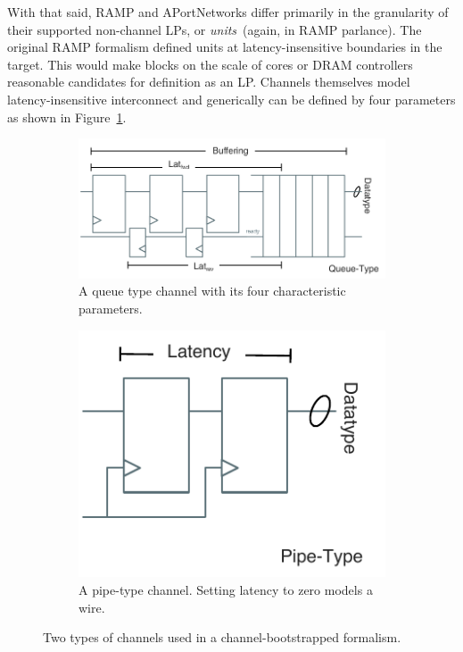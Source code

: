 With that said, RAMP and APortNetworks differ primarily in the granularity of
their supported non-channel LPs, or \emph{units}~(again, in RAMP parlance). The
original RAMP formalism defined units at latency-insensitive boundaries in the
target. This would make blocks on the scale of cores or DRAM controllers
reasonable candidates for definition as an LP. Channels themselves model
latency-insensitive interconnect and generically can be defined by four
parameters as shown in Figure~\ref{fig:queue-channel}.

\begin{figure}[htb]
    \centering
    \begin{subfigure}[t]{0.65\textwidth}
        \captionsetup{margin=0.25cm}
        \includegraphics[width=\columnwidth]{figures/queue-channel.pdf}
        \caption{A queue type channel with its four characteristic parameters.}
        \label{fig:queue-channel}
    \end{subfigure}
    \begin{subfigure}[t]{0.34\textwidth}
        \captionsetup{margin=0.25cm}
        \includegraphics[width=\columnwidth]{figures/pipe-channel.pdf}
        \caption{A pipe-type channel. Setting latency to zero models a wire.}
        \label{fig:pipe-channel}
    \end{subfigure}
    \centering
    \caption{Two types of channels used in a channel-bootstrapped formalism.}
\end{figure}

